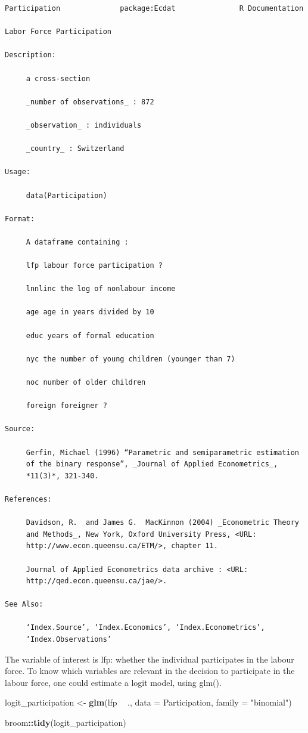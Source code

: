 \documentclass[]{gitbook}
\newenvironment{Shaded}{\begin{snugshade}}{\end{snugshade}}
\newcommand{\DataTypeTok}[1]{\textcolor[rgb]{0.13,0.29,0.53}{#1}}
\newcommand{\KeywordTok}[1]{\textcolor[rgb]{0.13,0.29,0.53}{\textbf{#1}}}
\newcommand{\NormalTok}[1]{#1}
\newcommand{\OperatorTok}[1]{\textcolor[rgb]{0.81,0.36,0.00}{\textbf{#1}}}
\newcommand{\StringTok}[1]{\textcolor[rgb]{0.31,0.60,0.02}{#1}}
\begin{document}
\begin{verbatim}
Participation              package:Ecdat               R Documentation

Labor Force Participation

Description:

     a cross-section

     _number of observations_ : 872

     _observation_ : individuals

     _country_ : Switzerland

Usage:

     data(Participation)

Format:

     A dataframe containing :

     lfp labour force participation ?

     lnnlinc the log of nonlabour income

     age age in years divided by 10

     educ years of formal education

     nyc the number of young children (younger than 7)

     noc number of older children

     foreign foreigner ?

Source:

     Gerfin, Michael (1996) “Parametric and semiparametric estimation
     of the binary response”, _Journal of Applied Econometrics_,
     *11(3)*, 321-340.

References:

     Davidson, R.  and James G.  MacKinnon (2004) _Econometric Theory
     and Methods_, New York, Oxford University Press, <URL:
     http://www.econ.queensu.ca/ETM/>, chapter 11.

     Journal of Applied Econometrics data archive : <URL:
     http://qed.econ.queensu.ca/jae/>.

See Also:

     ‘Index.Source’, ‘Index.Economics’, ‘Index.Econometrics’,
     ‘Index.Observations’
\end{verbatim}

The variable of interest is lfp: whether the individual participates in the labour force. To know
which variables are relevant in the decision to participate in the labour force, one could estimate
a logit model, using glm().

\begin{Shaded}
\begin{Highlighting}[]
\NormalTok{logit_participation <-}\StringTok{ }\KeywordTok{glm}\NormalTok{(lfp }\OperatorTok{~}\StringTok{ }\NormalTok{., }\DataTypeTok{data =}\NormalTok{ Participation, }\DataTypeTok{family =} \StringTok{"binomial"}\NormalTok{)}

\NormalTok{broom}\OperatorTok{::}\KeywordTok{tidy}\NormalTok{(logit_participation)}
\end{Highlighting}
\end{Shaded}
\end{document}
